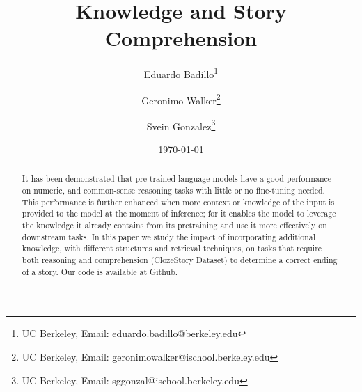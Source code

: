 \documentclass{article}
\title{Knowledge and Story Comprehension}
\author{Eduardo Badillo\thanks{UC Berkeley, Email: eduardo.badillo@berkeley.edu} \and Geronimo Walker\thanks{UC Berkeley, Email: 
geronimowalker@ischool.berkeley.edu} \and   Svein Gonzalez\thanks{UC Berkeley, Email: 
sggonzal@ischool.berkeley.edu}}
\date{\today}
\begin{document}
\maketitle

\begin{abstract}
\noindent %
It has been demonstrated that pre-trained language models have a good performance on numeric, and common-sense reasoning tasks with little or no fine-tuning needed. This performance is further enhanced when more context or knowledge of the input is provided to the model at the moment of inference; for it enables the model to leverage the knowledge it already contains from its pretraining and use it more effectively on downstream tasks. In this paper we study the impact of incorporating additional knowledge, with different structures and retrieval techniques, on tasks that require both reasoning and comprehension (ClozeStory Dataset) to determine a correct ending of a story. Our code is available at \href{https://github.com/sveinerss/w266_project}{Github}.
\end{abstract}
\end{document}
